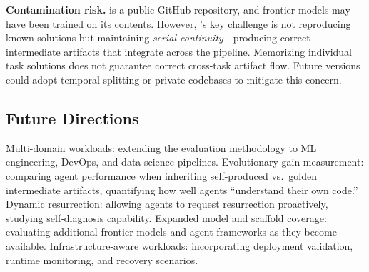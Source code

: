 \textbf{Contamination risk.}
\yatcc{} is a public GitHub repository, and frontier models may have been trained on its contents.
However, \eva{}'s key challenge is not reproducing known solutions but maintaining \emph{serial continuity}---producing correct intermediate artifacts that integrate across the pipeline.
Memorizing individual task solutions does not guarantee correct cross-task artifact flow.
Future versions could adopt temporal splitting or private codebases to mitigate this concern.

\subsection{Future Directions}


Multi-domain workloads: extending the evaluation methodology to ML engineering, DevOps, and data science pipelines.
Evolutionary gain measurement: comparing agent performance when inheriting self-produced vs.\ golden intermediate artifacts, quantifying how well agents ``understand their own code.''
Dynamic resurrection: allowing agents to request resurrection proactively, studying self-diagnosis capability.
Expanded model and scaffold coverage: evaluating additional frontier models and agent frameworks as they become available.
Infrastructure-aware workloads: incorporating deployment validation, runtime monitoring, and recovery scenarios.
